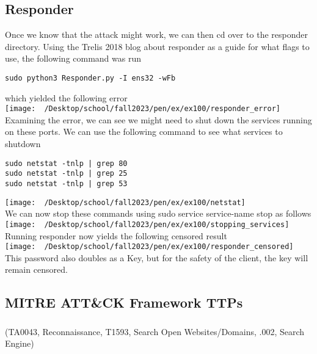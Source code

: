 \documentclass[notitlepage]{article}
\begin{document}
    \subsection{Responder}
    Once we know that the attack might work, we can then cd over to the responder directory. Using
    the Trelis 2018 blog about responder as a guide for what flags to use, the following command was
    run
\begin{verbatim}
sudo python3 Responder.py -I ens32 -wFb
\end{verbatim}
    which yielded the following error\\
\texttt{[image: ~/Desktop/school/fall2023/pen/ex/ex100/responder\_error]}\\
    Examining the error, we can see we might need to shut down the services running on these ports.
    We can use the following command to see what services to shutdown
\begin{verbatim}
sudo netstat -tnlp | grep 80
sudo netstat -tnlp | grep 25
sudo netstat -tnlp | grep 53
\end{verbatim}
\texttt{[image: ~/Desktop/school/fall2023/pen/ex/ex100/netstat]}\\
    We can now stop these commands using sudo service service-name stop as follows \\
\texttt{[image: ~/Desktop/school/fall2023/pen/ex/ex100/stopping\_services]}\\
    Running responder now yields the following censored result \\
\texttt{[image: ~/Desktop/school/fall2023/pen/ex/ex100/responder\_censored]}\\
    This password also doubles as a Key, but for the safety of the client, the key will remain
    censored.

    \subsection{MITRE ATT{\&}CK Framework TTPs}
    
	\subsubsection*{}
	\ttp(TA0043, Reconnaissance, T1593, Search Open Websites/Domains, .002, Search Engine)
    
\end{document}

